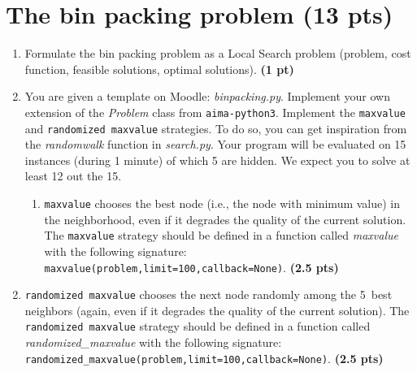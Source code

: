 \documentclass[11pt,a4paper]{report}
\begin{document}
\maketitle

\section{The bin packing problem (13 pts)}

\begin{enumerate}
\item Formulate the bin packing problem as a Local Search problem (problem, cost function, feasible solutions, optimal solutions). \textbf{(1 pt)}
\end{enumerate}

\begin{answers}[6cm]
\end{answers}


\begin{enumerate}
\setcounter{enumi}{1}
    \item You are given a template on Moodle: \textit{binpacking.py}. Implement your own extension of the \textit{Problem} class from \texttt{aima-python3}. Implement the \texttt{maxvalue} and \texttt{randomized maxvalue} strategies. To do so,	you can get inspiration from the \textit{randomwalk} function in \textit{search.py}. Your program will be evaluated on 15 instances (during 1 minute) of which 5 are hidden. We expect you to solve at least 12 out the 15.
    \begin{enumerate}
        \item \texttt{maxvalue} chooses the best node (i.e., the node with minimum
        value) in the neighborhood, even if it degrades the quality of the current solution. 
        The \texttt{maxvalue} strategy should be defined in a function called
        \textit{maxvalue} with the following signature: \\
        \texttt{maxvalue(problem,limit=100,callback=None)}. \textbf{(2.5 pts)}
    \end{enumerate}
\end{enumerate}

\begin{answers}[2.5 cm]
\end{answers}



\begin{enumerate}
\setcounter{enumi}{1}
\begin{enumerate}
\setcounter{enumii}{1}
    \item \texttt{randomized maxvalue} chooses the next node randomly among
        the 5~best neighbors (again, even if it degrades the quality of the current solution).
        The \texttt{randomized maxvalue} strategy should be defined in a function called
        \textit{randomized\_maxvalue} with the following signature: \\
        \texttt{randomized\_maxvalue(problem,limit=100,callback=None)}. \textbf{(2.5 pts)}
\end{enumerate}
\end{enumerate}
\end{document}
